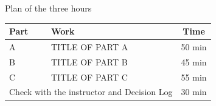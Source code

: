 
\begin{frame}{Plan of the three hours}
  \centering
  \begin{tabular}{llc}
    \toprule
    Part & Work & Time \\
    \midrule
    A & TITLE OF PART A & 50 min \\
    B & TITLE OF PART B & 45 min \\
    C & TITLE OF PART C & 55 min \\
    \midrule
    \multicolumn{2}{l}{Check with the instructor and Decision Log} & 30 min \\
    \bottomrule
  \end{tabular}
\end{frame}
